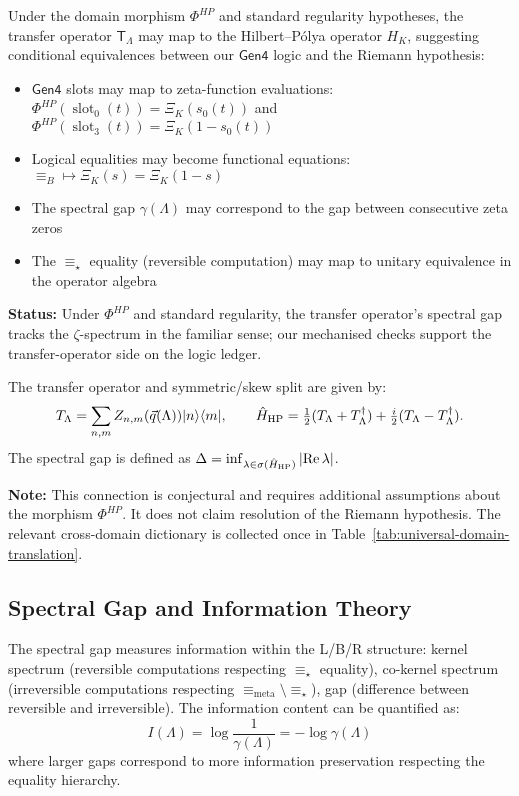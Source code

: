 \begin{conjecture}
\label{conj:hilbert-polya-connection}
Under the domain morphism $\Phi^{HP}$ and standard regularity hypotheses, the transfer operator $\mathsf{T}_\Lambda$ may map to the Hilbert–Pólya operator $H_K$, suggesting conditional equivalences between our $\mathsf{Gen4}$ logic and the Riemann hypothesis:
\begin{itemize}
\item $\mathsf{Gen4}$ slots may map to zeta-function evaluations: $\Phi^{HP}(\operatorname{slot}_0(t)) = \Xi_K(s_0(t))$ and $\Phi^{HP}(\operatorname{slot}_3(t)) = \Xi_K(1-s_0(t))$
\item Logical equalities may become functional equations: $\equiv_B \mapsto \Xi_K(s) = \Xi_K(1-s)$
\item The spectral gap $\gamma(\Lambda)$ may correspond to the gap between consecutive zeta zeros
\item The $\equiv_\star$ equality (reversible computation) may map to unitary equivalence in the operator algebra
\end{itemize}

\textbf{Status:} Under $\Phi^{HP}$ and standard regularity, the transfer operator's spectral gap tracks the $\zeta$-spectrum in the familiar sense; our mechanised checks support the transfer-operator side on the logic ledger.

The transfer operator and symmetric/skew split are given by:
\[
T_\Lambda=\sum_{n,m} Z_{n,m}(\vec q(\Lambda))|n\rangle\langle m|,\qquad
\hat H_{\rm HP}=\tfrac12(T_\Lambda+T_\Lambda^\dagger)+\tfrac{i}{2}(T_\Lambda-T_\Lambda^\dagger).
\]
The spectral gap is defined as $\Delta=\inf_{\lambda\in\sigma(\hat H_{\rm HP})}|\mathrm{Re}\,\lambda|$.

\textbf{Note:} This connection is conjectural and requires additional assumptions about the morphism $\Phi^{HP}$. It does not claim resolution of the Riemann hypothesis. The relevant cross-domain dictionary is collected once in Table~\ref{tab:universal-domain-translation}.
\end{conjecture}

\subsection{Spectral Gap and Information Theory}

\begin{definition}
\label{def:spectral-gap-info-lbr}
The spectral gap measures information within the L/B/R structure: kernel spectrum (reversible computations respecting $\equiv_\star$ equality), co-kernel spectrum (irreversible computations respecting $\equiv_{\text{meta}} \setminus \equiv_\star$), gap (difference between reversible and irreversible). The information content can be quantified as:
\[
I(\Lambda) = \log \frac{1}{\gamma(\Lambda)} = -\log \gamma(\Lambda)
\]
where larger gaps correspond to more information preservation respecting the equality hierarchy.
\end{definition}

